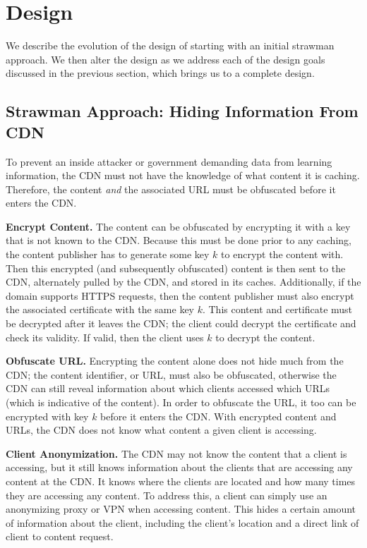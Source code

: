 \section{Design}
\label{sec:design}
We describe the evolution of the design of \system{} starting with an initial strawman approach.  We then 
alter the design as we address each of the design goals discussed in the previous section, which brings us 
to a complete design.

\subsection{Strawman Approach: Hiding Information From CDN}
To prevent an inside attacker or government demanding data from learning information, the CDN 
must not have the knowledge of what content it is caching.  Therefore, the content {\it and} the 
associated URL must be obfuscated before it enters the CDN.  

{\bf Encrypt Content.}  The content can be obfuscated by encrypting it with a key that is not 
known to the CDN.  Because this must be done prior to any caching, the content publisher 
has to generate some key $k$ to encrypt the content with.  Then this encrypted (and subsequently 
obfuscated) content is then sent to the CDN, alternately pulled by the CDN, and stored in its caches.  
Additionally, if the domain supports HTTPS requests, then the content publisher must also encrypt the 
associated certificate with the same key $k$.  This content and certificate must be decrypted after 
it leaves the CDN; the client could decrypt the certificate and check its validity.  If valid, then 
the client uses $k$ to decrypt the content.  

{\bf Obfuscate URL.} Encrypting the content alone does not hide much from the CDN; the content 
identifier, or URL, must also be obfuscated, otherwise the CDN can still reveal information about 
which clients accessed which URLs (which is indicative of the content).  In order to obfuscate the 
URL, it too can be encrypted with key $k$ before it enters the CDN.  With encrypted content and 
URLs, the CDN does not know what content a given client is accessing.

{\bf Client Anonymization.}  The CDN may not know the content that a client is accessing, but it 
still knows information about the clients that are accessing any content at the CDN.  It knows 
where the clients are located and how many times they are accessing any content.  To address this, 
a client can simply use an anonymizing proxy or VPN when accessing content.  This hides a certain 
amount of information about the client, including the client's location and a direct link of 
client to content request.


